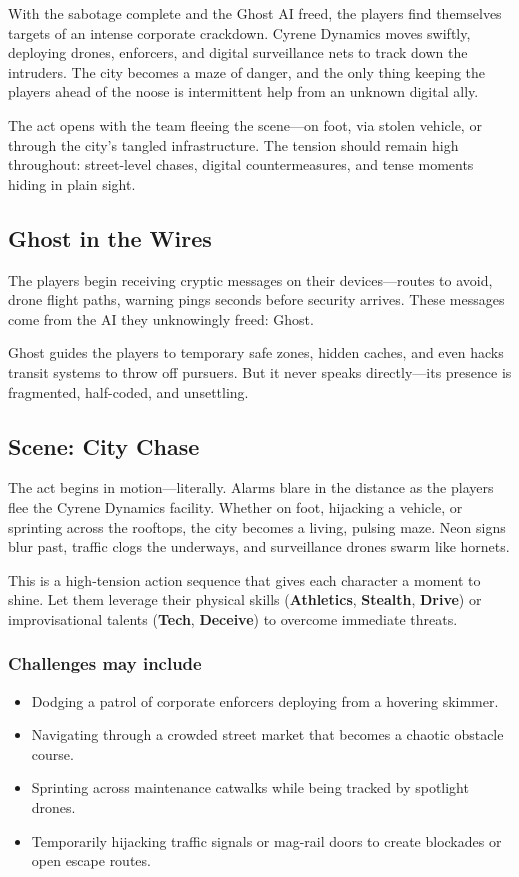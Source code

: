 \documentclass[nodeprecatedcode,bg=print]{dndbook}
\begin{document}
\begin{multicols}{2}
With the sabotage complete and the Ghost AI freed, the players find themselves targets of an intense corporate crackdown. Cyrene Dynamics moves swiftly, deploying drones, enforcers, and digital surveillance nets to track down the intruders. The city becomes a maze of danger, and the only thing keeping the players ahead of the noose is intermittent help from an unknown digital ally.

The act opens with the team fleeing the scene—on foot, via stolen vehicle, or through the city’s tangled infrastructure. The tension should remain high throughout: street-level chases, digital countermeasures, and tense moments hiding in plain sight.

\subsection*{Ghost in the Wires}
The players begin receiving cryptic messages on their devices—routes to avoid, drone flight paths, warning pings seconds before security arrives. These messages come from the AI they unknowingly freed: Ghost.

Ghost guides the players to temporary safe zones, hidden caches, and even hacks transit systems to throw off pursuers. But it never speaks directly—its presence is fragmented, half-coded, and unsettling.


\subsection*{Scene: City Chase}

The act begins in motion—literally. Alarms blare in the distance as the players flee the Cyrene Dynamics facility. Whether on foot, hijacking a vehicle, or sprinting across the rooftops, the city becomes a living, pulsing maze. Neon signs blur past, traffic clogs the underways, and surveillance drones swarm like hornets.

This is a high-tension action sequence that gives each character a moment to shine. Let them leverage their physical skills (\textbf{Athletics}, \textbf{Stealth}, \textbf{Drive}) or improvisational talents (\textbf{Tech}, \textbf{Deceive}) to overcome immediate threats.

\subsubsection{Challenges may include}
\begin{itemize}
    \item Dodging a patrol of corporate enforcers deploying from a hovering skimmer.
    \item Navigating through a crowded street market that becomes a chaotic obstacle course.
    \item Sprinting across maintenance catwalks while being tracked by spotlight drones.
    \item Temporarily hijacking traffic signals or mag-rail doors to create blockades or open escape routes.
\end{itemize}


\end{multicols}
\end{document}
